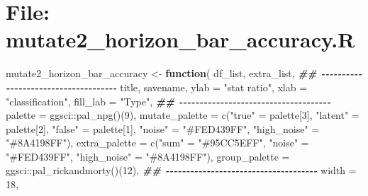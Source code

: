\documentclass[
]{article}
\newenvironment{Shaded}{\begin{snugshade}}{\end{snugshade}}
\newcommand{\AttributeTok}[1]{\textcolor[rgb]{0.77,0.63,0.00}{#1}}
\newcommand{\ControlFlowTok}[1]{\textcolor[rgb]{0.13,0.29,0.53}{\textbf{#1}}}
\newcommand{\DecValTok}[1]{\textcolor[rgb]{0.00,0.00,0.81}{#1}}
\newcommand{\DocumentationTok}[1]{\textcolor[rgb]{0.56,0.35,0.01}{\textbf{\textit{#1}}}}
\newcommand{\FunctionTok}[1]{\textcolor[rgb]{0.00,0.00,0.00}{#1}}
\newcommand{\NormalTok}[1]{#1}
\newcommand{\OtherTok}[1]{\textcolor[rgb]{0.56,0.35,0.01}{#1}}
\newcommand{\SpecialCharTok}[1]{\textcolor[rgb]{0.00,0.00,0.00}{#1}}
\newcommand{\StringTok}[1]{\textcolor[rgb]{0.31,0.60,0.02}{#1}}
\begin{document}
\hypertarget{file-mutate2_horizon_bar_accuracy.r}{%
\section{File: mutate2\_horizon\_bar\_accuracy.R}\label{file-mutate2_horizon_bar_accuracy.r}}

\begin{Shaded}
\begin{Highlighting}[]
\NormalTok{mutate2\_horizon\_bar\_accuracy }\OtherTok{\textless{}{-}} 
  \ControlFlowTok{function}\NormalTok{(}
\NormalTok{           df\_list,}
\NormalTok{           extra\_list,}
           \DocumentationTok{\#\# {-}{-}{-}{-}{-}{-}{-}{-}{-}{-}{-}{-}{-}{-}{-}{-}{-}{-}{-}{-}{-}{-}{-}{-}{-}{-}{-}{-}{-}{-}{-}{-}{-}{-}{-}{-}{-} }
\NormalTok{           title,}
\NormalTok{           savename,}
           \AttributeTok{ylab =} \StringTok{"stat ratio"}\NormalTok{,}
           \AttributeTok{xlab =} \StringTok{"classification"}\NormalTok{,}
           \AttributeTok{fill\_lab =} \StringTok{"Type"}\NormalTok{,}
           \DocumentationTok{\#\# {-}{-}{-}{-}{-}{-}{-}{-}{-}{-}{-}{-}{-}{-}{-}{-}{-}{-}{-}{-}{-}{-}{-}{-}{-}{-}{-}{-}{-}{-}{-}{-}{-}{-}{-}{-}{-} }
           \AttributeTok{palette =}\NormalTok{ ggsci}\SpecialCharTok{::}\FunctionTok{pal\_npg}\NormalTok{()(}\DecValTok{9}\NormalTok{),}
           \AttributeTok{mutate\_palette =} \FunctionTok{c}\NormalTok{(}\StringTok{"true"} \OtherTok{=}\NormalTok{ palette[}\DecValTok{3}\NormalTok{],}
                              \StringTok{"latent"} \OtherTok{=}\NormalTok{ palette[}\DecValTok{2}\NormalTok{],}
                              \StringTok{"false"} \OtherTok{=}\NormalTok{ palette[}\DecValTok{1}\NormalTok{],}
                              \StringTok{"noise"} \OtherTok{=} \StringTok{"\#FED439FF"}\NormalTok{,}
                              \StringTok{"high\_noise"} \OtherTok{=} \StringTok{"\#8A4198FF"}\NormalTok{),}
           \AttributeTok{extra\_palette =} \FunctionTok{c}\NormalTok{(}\StringTok{"sum"} \OtherTok{=} \StringTok{"\#95CC5EFF"}\NormalTok{,}
                             \StringTok{"noise"} \OtherTok{=} \StringTok{"\#FED439FF"}\NormalTok{,}
                             \StringTok{"high\_noise"} \OtherTok{=} \StringTok{"\#8A4198FF"}\NormalTok{),}
           \AttributeTok{group\_palette =}\NormalTok{ ggsci}\SpecialCharTok{::}\FunctionTok{pal\_rickandmorty}\NormalTok{()(}\DecValTok{12}\NormalTok{),}
           \DocumentationTok{\#\# {-}{-}{-}{-}{-}{-}{-}{-}{-}{-}{-}{-}{-}{-}{-}{-}{-}{-}{-}{-}{-}{-}{-}{-}{-}{-}{-}{-}{-}{-}{-}{-}{-}{-}{-}{-}{-} }
           \AttributeTok{width =} \DecValTok{18}\NormalTok{,}

\end{Highlighting}
\end{Shaded}
\end{document}
